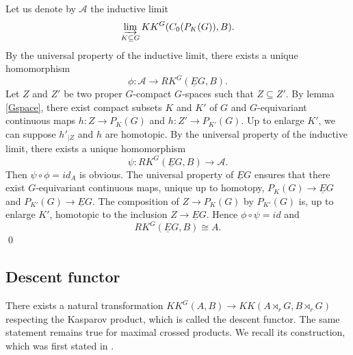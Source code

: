 \begin{dem} Let us denote by $\mathcal A$ the inductive limit 
\[\varinjlim_{K\subseteq G } KK^G(C_0(P_K(G)),B).\] 
By the universal property of the inductive limit, there exists a unique homomorphism 
\[\phi : \mathcal A \rightarrow RK^G(\underline E G,B).\] 
Let $Z$ and $Z'$ be two proper $G$-compact $G$-spaces such that $Z\subseteq Z'$. By lemma \ref{Gspace}, there exist compact subsets $K$ and $K'$ of $G$ and $G$-equivariant continuous maps $h : Z\rightarrow P_K(G)$ and $h : Z'\rightarrow P_{K'}(G)$. Up to enlarge $K'$, we can suppose $h'_{|Z}$ and $ h $ are homotopic. 
By the universal property of the inductive limit, there exists a unique homomorphism 
\[ \psi : RK^G(\underline E G,B)\rightarrow \mathcal A.\] 
Then $\psi\circ\phi = id_A$ is obvious. The universal property of $\underline E G $ ensures that there exist $G$-equivariant continuous maps, unique up to homotopy, $P_{K}(G) \rightarrow  \underline E G$ and $P_{K'}(G)\rightarrow  \underline E G$. The composition of $Z\rightarrow P_K(G)$ by $P_{K'}(G)$ is, up to enlarge $K'$, homotopic to the inclusion $Z\rightarrow \underline E G$.  Hence $\phi\circ \psi = id$ and 
\[RK^G(\underline E G,B) \cong A.\]
\qed
\end{dem}

\subsection{Descent functor}

There exists a natural transformation $KK^G(A,B)\rightarrow KK(A\rtimes_r G, B\rtimes_r G)$ respecting the Kasparov product, which is called the descent functor. The same statement remains true for maximal crossed products. We recall its construction, which was first stated in \cite{LeGall}.\\
 
